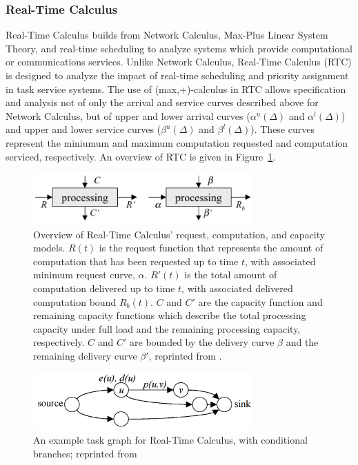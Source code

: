 \subsubsection{Real-Time Calculus}
Real-Time Calculus\cite{Thiele00real-timecalculus} builds from Network
Calculus, Max-Plus Linear System Theory, and real-time scheduling to
analyze systems which provide computational or communications
services.  Unlike Network Calculus, Real-Time Calculus (RTC) is
designed to analyze the impact of real-time scheduling and priority
assignment in task service systems.  The use of (max,+)-calculus in
RTC allows specification and analysis not of only the arrival and
service curves described above for Network Calculus, but of upper and
lower arrival curves ($\alpha^u(\Delta)$ and $\alpha^l(\Delta)$) and
upper and lower service curves ($\beta^u(\Delta)$ and
$\beta^l(\Delta)$).  These curves represent the miniumum and maximum
computation requested and computation serviced, respectively.  An
overview of RTC is given in Figure~\ref{fig:rtc_overview}.

\begin{figure}[htb]
  \centering
  \includegraphics[width=0.75\textwidth]{figs/rtc_overview.png}
  \caption{Overview of Real-Time Calculus' request, computation, and
    capacity models.  $R(t)$ is the request function that represents
    the amount of computation that has been requested up to time $t$,
    with associated minimum request curve, $\alpha$.  $R'(t)$ is the
    total amount of computation delivered up to time $t$, with
    associated delivered computation bound $R_b(t)$.  $C$ and $C'$ are
    the capacity function and remaining capacity functions which
    describe the total processing capacity under full load and the
    remaining processing capacity, respectively.  $C$ and $C'$ are
    bounded by the delivery curve $\beta$ and the remaining delivery
    curve $\beta'$, reprinted from \cite{Thiele00real-timecalculus}.}
  \label{fig:rtc_overview}
\end{figure}

\begin{figure}[htb]
  \centering
  \includegraphics[width=0.75\textwidth]{figs/task_graph.png}
  \caption{An example task graph for Real-Time Calculus, with
    conditional branches; reprinted from
    \cite{Thiele00real-timecalculus}}
  \label{fig:task_graph}
\end{figure}

